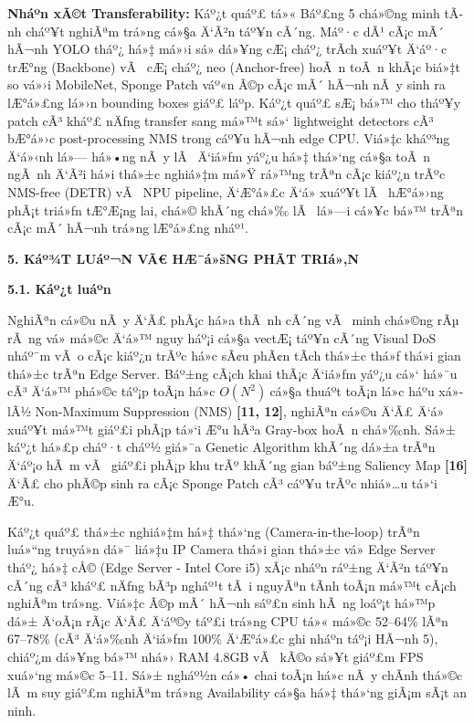 \documentclass[]{article}
\begin{document}
\textbf{Nháº­n xÃ©t Transferability:} Káº¿t quáº£ tá»« Báº£ng 5 chá»©ng minh tÃ­nh
cháº¥t nghiÃªm trá»ng cá»§a Ä‘Ã²n táº¥n cÃ´ng. Máº·c dÃ¹ cÃ¡c mÃ´ hÃ¬nh YOLO tháº¿ há»‡ má»›i
sá»­ dá»¥ng cÆ¡ cháº¿ trÃ­ch xuáº¥t Ä‘áº·c trÆ°ng (Backbone) vÃ  cÆ¡ cháº¿ neo
(Anchor-free) hoÃ n toÃ n khÃ¡c biá»‡t so vá»›i MobileNet, Sponge Patch váº«n Ã©p
cÃ¡c mÃ´ hÃ¬nh nÃ y sinh ra lÆ°á»£ng lá»›n bounding boxes giáº£ láº­p. Káº¿t
quáº£ sÆ¡ bá»™ cho tháº¥y patch cÃ³ kháº£ nÄƒng transfer sang má»™t sá»‘ lightweight
detectors cÃ³ bÆ°á»›c post-processing NMS trong cáº¥u hÃ¬nh edge CPU. Viá»‡c
kháº³ng Ä‘á»‹nh lá»— há»•ng nÃ y lÃ  Ä‘iá»ƒm yáº¿u há»‡ thá»‘ng cá»§a toÃ n ngÃ nh Ä‘Ã²i há»i thá»±c
nghiá»‡m má»Ÿ rá»™ng trÃªn cÃ¡c kiáº¿n trÃºc NMS-free (DETR) vÃ  NPU pipeline, Ä‘Æ°á»£c
Ä‘á» xuáº¥t lÃ  hÆ°á»›ng phÃ¡t triá»ƒn tÆ°Æ¡ng lai, chá»© khÃ´ng chá»‰ lÃ  lá»—i cá»¥c bá»™ trÃªn
cÃ¡c mÃ´ hÃ¬nh trá»ng lÆ°á»£ng nháº¹.

\textbf{5. Káº¾T LUáº¬N VÃ€ HÆ¯á»šNG PHÃT TRIá»‚N}

\textbf{5.1. Káº¿t luáº­n}

NghiÃªn cá»©u nÃ y Ä‘Ã£ phÃ¡c há»a thÃ nh cÃ´ng vÃ  minh chá»©ng rÃµ rÃ ng vá» má»©c Ä‘á»™
nguy háº¡i cá»§a vectÆ¡ táº¥n cÃ´ng Visual DoS nháº¯m vÃ o cÃ¡c kiáº¿n trÃºc há»c sÃ¢u phÃ¢n 
tÃ­ch thá»±c thá»ƒ thá»i gian thá»±c trÃªn Edge Server. Báº±ng cÃ¡ch khai thÃ¡c Ä‘iá»ƒm yáº¿u
cá»‘ há»¯u cÃ³ Ä‘á»™ phá»©c táº¡p toÃ¡n há»c \(O\left( N^{2} \right)\ \)cá»§a thuáº­t toÃ¡n
lá»c háº­u xá»­ lÃ½ Non-Maximum Suppression (NMS) \textbf{{[}11, 12{]}},
nghiÃªn cá»©u Ä‘Ã£ Ä‘á» xuáº¥t má»™t giáº£i phÃ¡p tá»‘i Æ°u hÃ³a Gray-box hoÃ n chá»‰nh. Sá»±
káº¿t há»£p cháº·t cháº½ giá»¯a Genetic Algorithm khÃ´ng dá»±a trÃªn Ä‘áº¡o hÃ m vÃ  giáº£i
phÃ¡p khu trÃº khÃ´ng gian báº±ng Saliency Map \textbf{{[}16{]}} Ä‘Ã£ cho phÃ©p
sinh ra cÃ¡c Sponge Patch cÃ³ cáº¥u trÃºc nhiá»…u tá»‘i Æ°u.

Káº¿t quáº£ thá»±c nghiá»‡m há»‡ thá»‘ng (Camera-in-the-loop) trÃªn luá»“ng truyá»n dá»¯
liá»‡u IP Camera thá»i gian thá»±c vá» Edge Server tháº¿ há»‡ cÅ© (Edge Server -
Intel Core i5) xÃ¡c nháº­n ráº±ng Ä‘Ã²n táº¥n cÃ´ng cÃ³ kháº£ nÄƒng bÃ³p ngháº¹t tÃ i
nguyÃªn tÃ­nh toÃ¡n má»™t cÃ¡ch nghiÃªm trá»ng. Viá»‡c Ã©p mÃ´ hÃ¬nh sáº£n sinh hÃ ng
loáº¡t há»™p dá»± Ä‘oÃ¡n rÃ¡c Ä‘Ã£ Ä‘áº©y táº£i trá»ng CPU tá»« má»©c 52--64\% lÃªn 67--78\%
(cÃ³ Ä‘á»‰nh Ä‘iá»ƒm 100\% Ä‘Æ°á»£c ghi nháº­n táº¡i HÃ¬nh 5), chiáº¿m dá»¥ng bá»™ nhá»› RAM
4.8GB vÃ  kÃ©o sá»¥t giáº£m FPS xuá»‘ng má»©c 5--11. Sá»± ngháº½n
cá»• chai toÃ¡n há»c nÃ y chÃ­nh thá»©c lÃ m suy giáº£m nghiÃªm trá»ng Availability
cá»§a há»‡ thá»‘ng giÃ¡m sÃ¡t an ninh.
\end{document}
